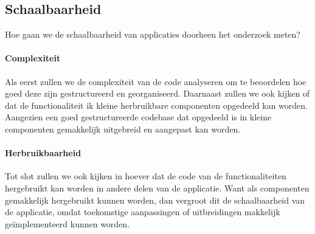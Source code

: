 \subsection{Schaalbaarheid}
Hoe gaan we de schaalbaarheid van applicaties doorheen het onderzoek meten?

\paragraph{Complexiteit}
Als eerst zullen we de complexiteit van de code analyseren om te beoordelen hoe goed deze zijn gestructureerd en georganiseerd.
Daarnaast zullen we ook kijken of dat de functionaliteit ik kleine herbruikbare componenten opgedeeld kan worden. Aangezien een 
goed gestructureerde codebase dat opgedeeld is in kleine componenten gemakkelijk uitgebreid en aangepast kan worden.

\paragraph{Herbruikbaarheid}
Tot slot zullen we ook kijken in hoever dat de code van de functionaliteiten hergebruikt kan worden in andere 
delen van de applicatie. Want als componenten gemakkelijk hergebruikt kunnen worden, dan vergroot dit de schaalbaarheid 
van de applicatie, omdat toekomstige aanpassingen of uitbreidingen makkelijk geïmplementeerd kunnen worden.
